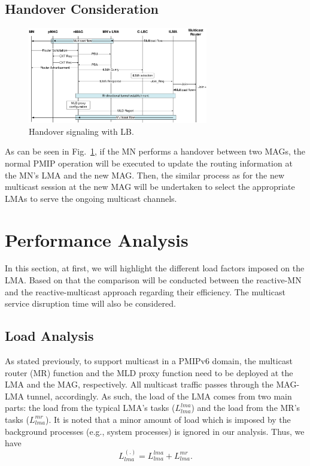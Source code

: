 \subsection{Handover Consideration}
\begin{figure}[h!] 
 \begin{center} 
 \includegraphics[width=0.70\textwidth]{./Part2/Chapter5/figures/c7_handover_multicast.eps} 
    \caption[Load balancing-related signaling when a node performs a handover in a PMIPv6 domain.]{Handover signaling with LB.}
        \label{fig:handover_multicast}
  \end{center} 
\end{figure}
As can be seen in Fig.~\ref{fig:handover_multicast}, if the MN performs a handover between two MAGs, the normal PMIP operation will be executed to update the routing information at the MN's LMA and the new MAG. Then, the similar process as for the new multicast session at the new MAG will be undertaken to select the appropriate LMAs to serve the ongoing multicast channels.

\section{Performance Analysis}\label{ch7:performance_analysis}
In this section, at first, we will highlight the different load factors imposed on the LMA. Based on that the comparison will be conducted between the reactive-MN and the reactive-multicast approach regarding their efficiency. The multicast service disruption time will also be considered. 
\subsection{Load Analysis}
As stated previously, to support multicast in a PMIPv6 domain, the multicast router (MR) function and the MLD proxy function \cite{RFC_6224} need to be deployed at the LMA and the MAG, respectively. All multicast traffic passes through the MAG-LMA tunnel, accordingly. As such, the load of the LMA comes from two main parts: the load from the typical LMA's tasks ($L_{lma}^{lma}$) and the load from the MR's tasks ($L^{mr}_{lma}$). It is noted that a minor amount of load which is imposed by the background processes (e.g., system processes) is ignored in our analysis.   
Thus, we have\\
\begin{equation}
L_{lma}^{(.)} = L_{lma}^{lma} + L_{lma}^{mr}.
\end{equation}

